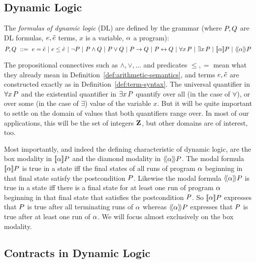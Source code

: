 \documentclass[11pt,twoside]{scrartcl}
\begin{document}
\subsection{Dynamic Logic}

\begin{definition}[DL formula]
The \emph{formulas of dynamic logic} ({DL}) are defined by the grammar
(where $P,Q$ are DL formulas, $e,\tilde{e}$ terms, $x$ is a variable, $\alpha$ a program):
  \[
  \asfml,\bsfml ~\bebecomes~
  \astrm=\bstrm \alternative
  \astrm\leq\bstrm \alternative
  \lnot \asfml \alternative
  \asfml \land \bsfml \alternative
  \asfml \lor \bsfml \alternative
  \asfml \limply \bsfml \alternative
  \asfml \lbisubjunct \bsfml \alternative
  \lforall{x}{\asfml} \alternative 
  \lexists{x}{\asfml} \alternative
  \dbox{\asprg}{\asfml}
  \alternative \ddiamond{\asprg}{\asfml}
  \]
\end{definition}

The propositional connectives such as $\land,\lor,\ldots$ and predicates $\le,=$ mean what they already mean in Definition~\ref{def:arithmetic-semantics}, and terms $e,\tilde{e}$ are constructed exactly as in Definition~\ref{def:term-syntax}.
The universal quantifier in \(\forall x{\,} P\) and the existential quantifier in \(\exists x{\,} P\) quantify over all (in the case of $\forall$), or over some (in the case of $\exists$) value of the variable $x$.
But it will be quite important to settle on the domain of values that both quantifiers range over.
In most of our applications, this will be the set of integers $\mathbf{Z}_{}$, but other domains are of interest, too.

Most importantly, and indeed the defining characteristic of dynamic logic, are the box modality in \(\dbox{\asprg}{\asfml}\) and the diamond modality in \(\ddiamond{\asprg}{\asfml}\).
The modal formula \(\dbox{\asprg}{\asfml}\) is true in a state iff the final states of all runs of program $\alpha$ beginning in that final state satisfy the postcondition $P$.
Likewise the modal formula \(\ddiamond{\asprg}{\asfml}\) is true in a state iff there is a final state for at least one run of program $\alpha$ beginning in that final state that satisfies the postcondition $P$.
So \(\dbox{\asprg}{\asfml}\) expresses that $P$ is true after all terminating runs of $\alpha$ whereas \(\ddiamond{\asprg}{\asfml}\) expresses that $P$ is true after at least one run of $\alpha$. We will focus almost exclusively on the box modality.

\subsection{Contracts in Dynamic Logic}
\end{document}
